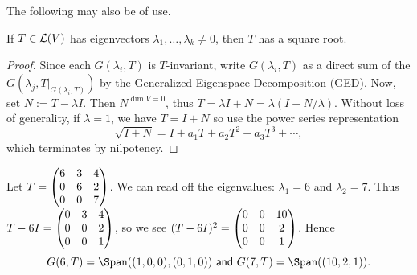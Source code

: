 \documentclass{article}
\begin{document}
The following may also be of use.
\begin{lemma}
If $T\in \mathcal L(V)$ has eigenvectors $\lambda_1, \ldots, \lambda_k \neq 0$, then $T$ has a square root.
\end{lemma}
\begin{proof}
Since each $G(\lambda_i, T)$ is $T$-invariant, write $G(\lambda_i, T)$ as a direct sum of the $G(\lambda_j, T|_{G(\lambda_i, T)})$ by the Generalized Eigenspace Decomposition (GED). Now, set $N := T - \lambda I$. Then $N^{\dim V= 0}$, thus $T = \lambda I+N = \lambda (I + N/\lambda)$. Without loss of generality, if $\lambda = 1$, we have $T = I+N$ so use the power series representation
$$\sqrt{I+N} = I + a_1T + a_2T^2 + a_3T^3 + \cdots,$$
which terminates by nilpotency.
\end{proof}
\begin{example}
Let $T = \begin{pmatrix}6 & 3 & 4 \\ 0 & 6 & 2 \\ 0 & 0 & 7 \end{pmatrix}$. We can read off the eigenvalues: $\lambda_1 =6$ and $\lambda_2 = 7$. Thus $T- 6I = \begin{pmatrix}0 & 3 & 4 \\ 0 & 0 & 2 \\ 0 & 0 & 1 \end{pmatrix}$, so we see $(T-6I)^2 = \begin{pmatrix}0 & 0 & 10 \\ 0 & 0 & 2 \\ 0 & 0 & 1 \end{pmatrix}$. Hence
$$G(6, T) = \Span((1,0,0), (0,1,0)) \textsf{ and } G(7, T) = \Span((10, 2, 1)).$$
\end{example}
\end{document}
